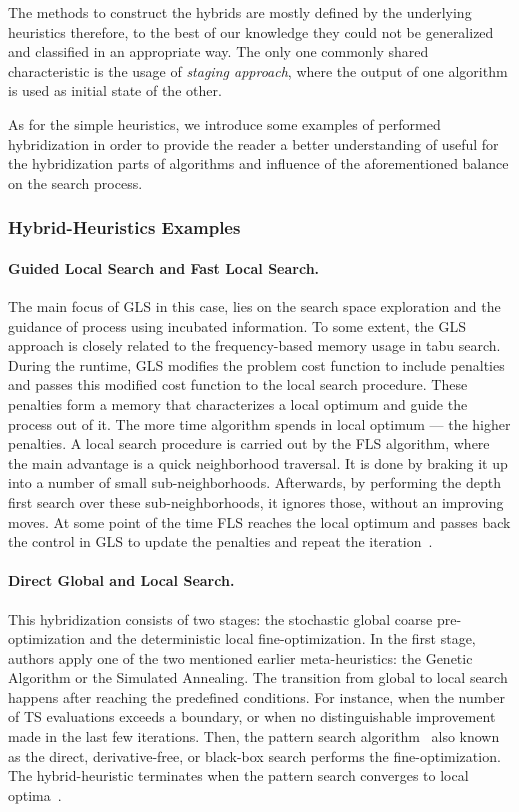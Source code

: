 The methods to construct the hybrids are mostly defined by the underlying heuristics therefore, to the best of our knowledge they could not be generalized and classified in an appropriate way. The only one commonly shared characteristic is the usage of \textit{staging approach}, where the output of one algorithm is used as initial state of the other. 

As for the simple heuristics, we introduce some examples of performed hybridization in order to provide the reader a better understanding of useful for the hybridization parts of algorithms and influence of the aforementioned balance on the search process.

\subsubsection{Hybrid-Heuristics Examples}
\paragraph{Guided Local Search and Fast Local Search.}
The main focus of GLS in this case, lies on the search space exploration and the guidance of process using incubated information. To some extent, the GLS approach is closely related to the frequency-based memory usage in tabu search. During the runtime, GLS modifies the problem cost function to include penalties and passes this modified cost function to the local search procedure. These penalties form a memory that characterizes a local optimum and guide the process out of it. The more time algorithm spends in local optimum — the higher penalties. A local search procedure is carried out by the FLS algorithm, where the main advantage is a quick neighborhood traversal. It is done by braking it up into a number of small sub-neighborhoods. Afterwards, by performing the depth first search over these sub-neighborhoods, it ignores those, without an improving moves. At some point of the time FLS reaches the local optimum and passes back the control in GLS to update the penalties and repeat the iteration~\cite{tsang1997fast}.

\paragraph{Direct Global and Local Search.}
This hybridization consists of two stages: the stochastic global coarse pre-optimization and the deterministic local fine-optimization. In the first stage, authors apply one of the two mentioned earlier meta-heuristics: the Genetic Algorithm or the Simulated Annealing. The transition from global to local search happens after reaching the predefined conditions. For instance, when the number of TS evaluations exceeds a boundary, or when no distinguishable improvement made in the last few iterations. Then, the pattern search algorithm~\cite{hooke1961direct} also known as the direct, derivative-free, or black-box search performs the fine-optimization. The hybrid-heuristic terminates when the pattern search converges to local optima~\cite{syrjakow1999efficient}.


